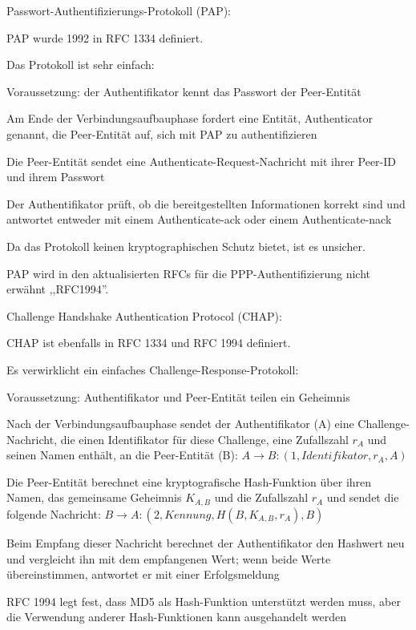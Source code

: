 \documentclass[a4paper]{article}
\begin{document}
\begin{multicols}{3}
      \begin{itemize*}
            \item Passwort-Authentifizierungs-Protokoll (PAP):
            \begin{itemize*}
                  \item PAP wurde 1992 in RFC 1334 definiert.
                  \item Das Protokoll ist sehr einfach:
                  \begin{itemize*} \item Voraussetzung: der Authentifikator kennt das Passwort der Peer-Entität \item Am Ende der Verbindungsaufbauphase fordert eine Entität, Authenticator genannt, die Peer-Entität auf, sich mit PAP zu authentifizieren \item Die Peer-Entität sendet eine Authenticate-Request-Nachricht mit ihrer Peer-ID und ihrem Passwort \item Der Authentifikator prüft, ob die bereitgestellten Informationen korrekt sind und antwortet entweder mit einem Authenticate-ack oder einem Authenticate-nack \end{itemize*}
                  \item Da das Protokoll keinen kryptographischen Schutz bietet, ist es unsicher.
                  \item PAP wird in den aktualisierten RFCs für die PPP-Authentifizierung nicht erwähnt ,,RFC1994''.
            \end{itemize*}
            \item Challenge Handshake Authentication Protocol (CHAP):
            \begin{itemize*}
                  \item CHAP ist ebenfalls in RFC 1334 und RFC 1994 definiert.
                  \item Es verwirklicht ein einfaches Challenge-Response-Protokoll:
                  \begin{itemize*} \item Voraussetzung: Authentifikator und Peer-Entität teilen ein Geheimnis \item Nach der Verbindungsaufbauphase sendet der Authentifikator (A) eine Challenge-Nachricht, die einen Identifikator für diese Challenge, eine Zufallszahl $r_A$ und seinen Namen enthält, an die Peer-Entität (B): $A \rightarrow B: (1, Identifikator, r_A, A)$ \item Die Peer-Entität berechnet eine kryptografische Hash-Funktion über ihren Namen, das gemeinsame Geheimnis $K_{A,B}$ und die Zufallszahl $r_A$ und sendet die folgende Nachricht: $B \rightarrow A: (2, Kennung, H(B, K_{A,B}, r_A), B)$ \item Beim Empfang dieser Nachricht berechnet der Authentifikator den Hashwert neu und vergleicht ihn mit dem empfangenen Wert; wenn beide Werte übereinstimmen, antwortet er mit einer Erfolgsmeldung \item RFC 1994 legt fest, dass MD5 als Hash-Funktion unterstützt werden muss, aber die Verwendung anderer Hash-Funktionen kann ausgehandelt werden \end{itemize*}

\end{itemize*}
\end{itemize*}
\end{multicols}
\end{document}

